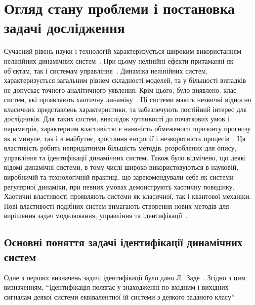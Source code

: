 \chapter{Огляд стану проблеми і постановка задачі дослідження}

Сучасний рівень науки і технологій характеризується широким
використанням нелінійних динамічних систем~\cite{andronov_vitt_haikin,
anisch_nonlin_eff, mishenko_du_small_relax, nonlin_vibro, malinetskii_modern_methods_nl_dyn}. При цьому
нелінійні ефекти притаманні як об'єктам, так і системам
управління~\cite{kubik_nlsc, vukobr_nonadopt}. Динаміка нелінійних систем,
характеризується загальним рівнем складності моделей,
та у більшості випадків не допускає точного аналітичного
уявлення.
Крім цього, було виявлено,
клас систем, які проявляють
хаотичну динаміку~\cite{moon_chaotic_vibr, magni_theory_dyn_chaos, kuznetsov_dyn_chaos,
neimark_stoch_chaos_vibro, anisch_reg_and_chaotic_vibro}.
Ці системи мають незвичні відносно класичних представлень характеристики, та
забезпечують
постійний інтерес для дослідників.
Для таких систем, внаслідок
чутливості до початкових умов і параметрів, характерним
властивістю є наявність обмеженого горизонту прогнозу як в
минуле, так і в майбутнє, зростання ентропії і незворотність
процесів~\cite{chernavskii_syn_info,prigogine_from_existent,koltsova_nl_dyn_chem}. Ця
властивість робить непридатними більшість методів, розроблених
для опису, управління та ідентифікації динамічних систем. Також
було відмічено, що деякі відомі динамічні системи, в тому числі
широко використовуються в науковій, виробничій та технологічній
практиці, що зарекомендували себе як системи регулярної динаміки,
при певних умовах демонструють хаотичну поведінку. Хаотичні
властивості проявляють системи як класичної, так і квантової
механіки. Нові властивості подібних систем вимагають створення
нових методів для вирішення задач моделювання, управління та
ідентифікації~\cite{karabutov_adapt_id_sys,dmitriev_trans_chaos_lowpower}.


\section{Основні поняття задачі ідентифікації динамічних систем} %

Одне з перших визначень задачі ідентифікації було дано
Л.~Заде~\cite{zadeh_id_1956}. Згідно з цим визначенням,
``Ідентифікація полягає у знаходженні по вхідним і вихідних сигналам деякої
системи еквівалентної їй системи з деякого заданого
класу''~\cite{eykhoff_id_base, eykhoff_modern_id, lung_id_sys}.


